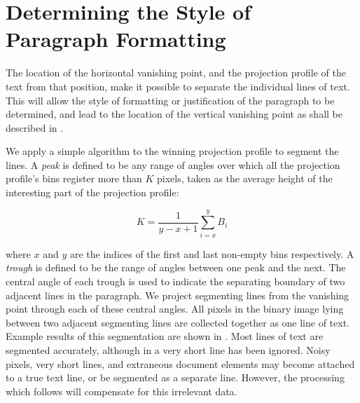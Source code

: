 

\section{Determining the Style of Paragraph Formatting} \label{sec-parags}

The location of the horizontal vanishing point, and the projection profile of
the text from that position, make it possible to separate the individual lines
of text.  This will allow the style of formatting or justification of the
paragraph to be determined, and lead to the location of the vertical vanishing
point as shall be described in .

We apply a simple algorithm to the winning projection profile to segment the
lines.  A {\em peak} is defined to be any range of angles over which all the
projection profile's bins register more than $K$ pixels, taken as the average
height of the interesting part of the projection profile:

\begin{equation}
K= \frac{1}{y-x+1} \sum_{i=x}^{y}B_i
\end{equation}

{\parindent 0mm
where $x$ and $y$ are the indices of the first and last non-empty bins respectively.
A {\em trough} is defined to be the range of angles between one peak and the next.  
The central angle of each trough is used to indicate the separating boundary of
two adjacent lines in the paragraph.  We project segmenting lines from the
vanishing point through each of these central angles.
All pixels in the binary image lying between two adjacent segmenting
lines are collected together as one line of text. Example results of this
segmentation are shown in .  Most lines of
text are segmented accurately, although in  a very short
line has been ignored.  Noisy pixels, very short lines, and extraneous document
elements may become attached to a true text line, or be segmented as a separate
line.  However, the processing which follows will compensate for this irrelevant
data. 
} 


